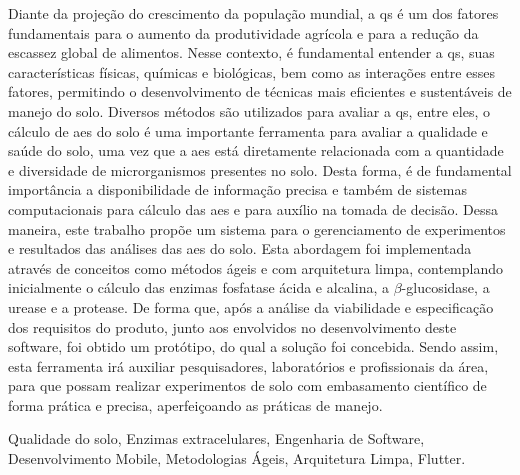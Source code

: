 Diante da projeção do crescimento da população mundial, a \ac{qs} é um dos fatores fundamentais para o aumento da produtividade agrícola e para a redução da escassez global de alimentos. Nesse contexto, é fundamental entender a \ac{qs}, suas características físicas, químicas e biológicas, bem como as interações entre esses fatores, permitindo o desenvolvimento de técnicas mais eficientes e sustentáveis de manejo do solo. Diversos métodos são utilizados para avaliar a \ac{qs}, entre eles, o cálculo de \acp{ae} do solo é uma importante ferramenta para avaliar a qualidade e saúde do solo, uma vez que a \acp{ae} está diretamente relacionada com a quantidade e diversidade de microrganismos presentes no solo. Desta forma, é de fundamental importância a disponibilidade de informação precisa e também de sistemas computacionais para cálculo das \acp{ae} e para auxílio na tomada de decisão. Dessa maneira, este trabalho propõe um sistema para o gerenciamento de experimentos e resultados das análises das \acp{ae} do solo. Esta abordagem foi implementada através de conceitos como métodos ágeis e com arquitetura limpa, contemplando inicialmente o cálculo das enzimas fosfatase ácida e alcalina, a $\beta$-glucosidase, a urease e a protease. De forma que, após a análise da viabilidade e especificação dos requisitos do produto, junto aos envolvidos no desenvolvimento deste software, foi obtido um protótipo, do qual a solução foi concebida. Sendo assim, esta ferramenta irá auxiliar pesquisadores, laboratórios e profissionais da área, para que possam realizar experimentos de solo com embasamento científico de forma prática e precisa, aperfeiçoando as práticas de manejo.

\begin{keywords}
Qualidade do solo, Enzimas extracelulares, Engenharia de Software, Desenvolvimento Mobile, Metodologias Ágeis, Arquitetura Limpa, Flutter.
\end{keywords}